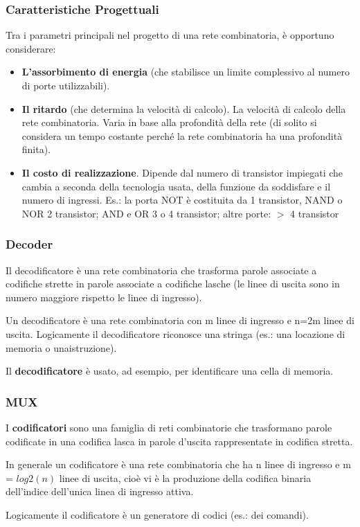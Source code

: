 \documentclass[12pt]{article} %
\begin{document}
\subsubsection{Caratteristiche Progettuali}
Tra i parametri principali nel progetto di una rete combinatoria, è opportuno considerare:
\begin{itemize}
    \item \textbf{L’assorbimento di energia} (che stabilisce un limite complessivo al numero di porte utilizzabili).
    \item \textbf{Il ritardo} (che determina la velocità di calcolo). La velocità di calcolo della rete combinatoria. Varia in base alla profondità della rete (di solito si considera un tempo costante perché la rete combinatoria ha una profondità finita).
    \item \textbf{Il costo di realizzazione}. Dipende dal numero di transistor impiegati che cambia a seconda della tecnologia usata, della funzione da soddisfare e il numero di ingressi. Es.: la porta NOT è costituita da 1 transistor, NAND o NOR 2 transistor; AND e OR 3 o 4 transistor; altre porte: \(>\) 4 transistor\par\medskip\noindent
\end{itemize}
\subsubsection{Decoder}
Il decodificatore è una rete combinatoria che trasforma parole associate a codifiche strette in parole associate a codifiche lasche (le linee di uscita sono in numero maggiore rispetto le linee di ingresso).\par\medskip\noindent
Un decodificatore è una rete combinatoria con m linee di ingresso e n=2m linee di uscita. Logicamente il decodificatore riconosce una stringa (es.: una locazione di memoria o unaistruzione).\par\medskip\noindent
Il \textbf{decodificatore} è usato, ad esempio, per identificare una cella di memoria.\par\medskip\noindent

\subsubsection{MUX}
I \textbf{codificatori} sono una famiglia di reti combinatorie che trasformano parole codificate in una codifica lasca in parole d’uscita rappresentate in codifica stretta. \par\medskip\noindent
In generale un codificatore è una rete combinatoria che ha n linee di ingresso e m = \(log2(n) \) linee di uscita, cioè vi è la produzione della codifica binaria dell’indice dell’unica linea di ingresso attiva. \par\medskip\noindent
Logicamente il codificatore è un generatore di codici (es.: dei comandi).
\end{document}
